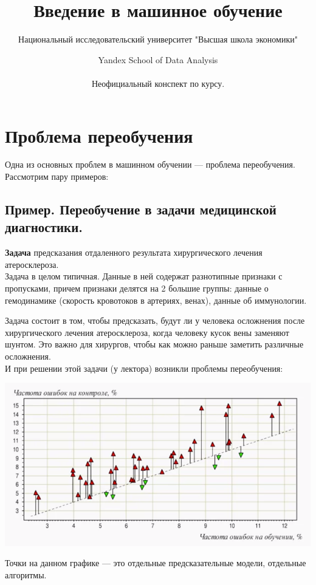 \documentclass{article}
\title{Введение в машинное обучение}
\author{Национальный исследовательский университет "Высшая школа экономики" \and Yandex School of Data Analysis\\\\
Неофициальный конспект по курсу.}
\begin{document}
\maketitle

\section{Проблема переобучения}

Одна из основных проблем в машинном обучении --- проблема переобучения. Рассмотрим пару примеров:

\subsection{Пример. Переобучение в задачи медицинской диагностики.}

\textbf{Задача} предсказания отдаленного результата хирургического лечения атеросклероза.
\\

Задача в целом типичная. Данные в ней содержат разнотипные признаки с пропусками, причем признаки делятся на 2 большие группы: данные о гемодинамике (скорость кровотоков в артериях, венах), данные об иммунологии. 

Задача состоит в том, чтобы предсказать, будут ли у человека осложнения после хирургического лечения атеросклероза, когда человеку кусок вены заменяют шунтом. Это важно для хирургов, чтобы как можно раньше заметить различные осложнения.
\\

И при решении этой задачи (у лектора) возникли проблемы переобучения:

\begin{center}
    \includegraphics[scale=0.6]{images/2_1.png}
\end{center}

Точки на данном графике --- это отдельные предсказательные модели, отдельные алгоритмы.
\end{document}
